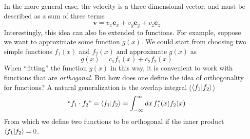 \documentclass[../Main/chem371-notes.tex]{subfiles}
\begin{document}
In the more general case, the velocity is a three dimensional vector, and must be described as a sum of three terms
\begin{equation}
\mathbf{v} = v_x \mathbf{e}_x + v_y \mathbf{e}_y + v_z \mathbf{e}_z
\end{equation}
Interestingly, this idea can also be extended to functions.
For example, suppose we want to approximate some function $g(x)$.
We could start from choosing two simple functions $f_1(x)$ and $f_2(x)$ and approximate $g(x)$ as
\begin{equation}
\label{eq:fit_simple}
g(x) = c_1 f_1(x) + c_2 f_2(x)
\end{equation}
When ``fitting'' the function $g(x)$ in this way, it is convenient to work with functions that are \emph{orthogonal}.
But how does one define the idea of orthogonality for functions? A natural generalization is the overlap integral ($\braket{f_1 | f_2}$)
\begin{equation}
\text{``}f_1 \cdot f_2\text{''} = \braket{f_1 | f_2} = \int_{-\infty}^{\infty} dx \, f_1^*(x) f_2(x)
\end{equation}
From which we define two functions to be orthogonal if the inner product $\braket{f_1 | f_2}  = 0$.
 
\end{document}
